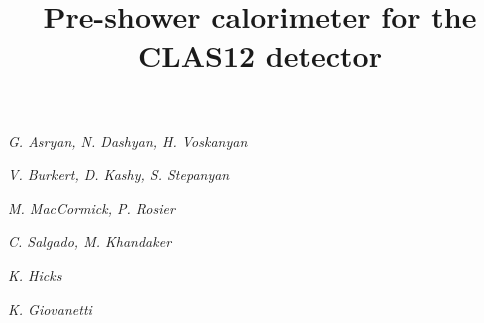 \thispagestyle{empty}

\begin{center}
\title{Pre-shower calorimeter for the CLAS12 detector}
\date{}


\maketitle

{\it{G. Asryan, N. Dashyan, H. Voskanyan \\}}
\smallskip
{\small{\yerevan}}
\bigskip

{\it{V. Burkert, D. Kashy, S. Stepanyan \\}}
\smallskip
{\small{\jlab}}
\bigskip

\vskip 0.4cm
{\it{M. MacCormick, P. Rosier \\}}
\smallskip
{\small{\ipn}}
\bigskip

\vskip 0.4cm
{\it{C. Salgado, M. Khandaker\\}}
\smallskip
{\small{\nsuva}}
\bigskip


{\it K. Hicks\\}
\smallskip
{\small \ohio}
\bigskip

{\it K. Giovanetti\\}
\smallskip
{\small \jmu}



\end{center}

